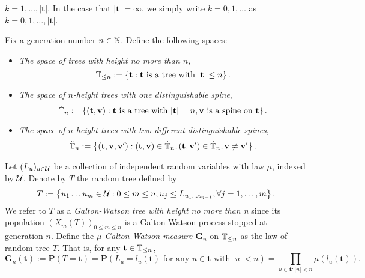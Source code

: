 \documentclass[12pt]{amsart}
\numberwithin{equation}{section}
\newcommand{\defn}[1]{{\em #1}}
\newcommand{\prob}{\mathbf P}
\newcommand{\set}[1]{\left\{ #1 \right\}}
\newcommand{\tree}{\mathbf t}
\newcommand{\spine}{\mathbf v}
\newcommand{\bG}{\mathbf G}\newcommand{\bbG}{\mathbb G}\newcommand{\cG}{\mathcal G}
\begin{document}
	$k=1,\dots, |\tree|$. 
	In the case that $|\tree|=\infty$, 
	we simply write $k=0,1,\dots$ as $k=0,1,\dots, |\tree|$.
\par
	Fix a generation number $n\in \mathbb N$. Define the following spaces:
\begin{itemize}
\item
	\defn{The space of trees with height no more than $n$},
\begin{equation*}
		\bbT_{\leq n}
	:=
		\set{\tree:\tree\text{ is a tree with }|\tree|\leq n}.
\end{equation*}
\item
	\defn {The space of $n$-height trees with one distinguishable spine},
\begin{equation*}
		\dot{\bbT}_n
	:=
		\set{(\tree,\spine):\tree \text{ is a tree with } |\tree|=n, 
\spine \text{ is a spine on } \tree}.
\end{equation*}
	\item \defn{The space of $n$-height trees with two different distinguishable spines},
\begin{equation*}
		\ddot{\bbT}_n
	:=
		\set{(\tree,\spine,\spine'):(\tree,\spine)\in\dot\bbT_n,(\tree,\spine')\in\dot\bbT_n,\spine\neq\spine'}.
\end{equation*}
\end{itemize}
\par
	Let $(L_u)_{u\in\mathcal U}$ be a collection of independent random variables with law $\mu$, indexed by $\mathcal U$. Denote by $T$ the random tree defined by
\begin{equation*}
		T
	:=
		\set{u_1\dots u_m\in \cU: 0\le m\le n, u_j\leq L_{u_1\dots u_{j-1}},\forall j=1,\dots,m}.
\end{equation*}
	We refer to $T$ as a \defn{Galton-Watson tree with height no more than n} since its population 
	$(X_m(T))_{0\le m\le n}$
	is a Galton-Watson process stopped at generation $n$. 
	Define the \defn{$\mu$-Galton-Watson measure $\bG_n$} on $\mathbb T_{\leq n}$ as the law of random tree $T$. That is, for any $\tree\in\bbT_{\leq n}$,
\begin{equation*}
		\bG_n(\tree)
    :=
		\prob(T=\tree)
	=
        \prob(L_u=l_u(\tree)\text{ for any } u\in\tree \text{ with }|u|<n)
	=
		\prod_{u\in \tree:|u|<n}\mu(l_u(\tree)).
\end{equation*}
\end{document}
